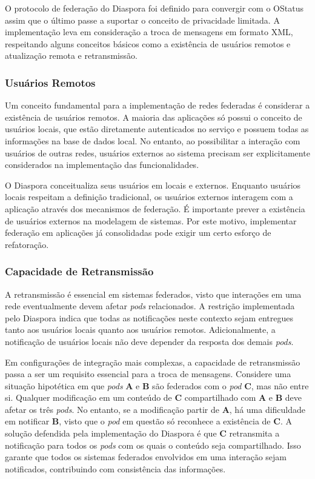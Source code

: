 O protocolo de federação do Diaspora foi definido para convergir com o OStatus assim
que o último passe a suportar o conceito de privacidade limitada. A implementação
leva em consideração a troca de mensagens em formato XML, respeitando alguns
conceitos básicos como a existência de usuários remotos e atualização remota e
retransmissão.

\subsubsection{Usuários Remotos}

Um conceito fundamental para a implementação de redes federadas é considerar a
existência de usuários remotos. A maioria das aplicações só possui o conceito de
usuários locais, que estão diretamente autenticados no serviço e possuem todas as
informações na base de dados local. No entanto, ao possibilitar a interação com
usuários de outras redes, usuários externos ao sistema precisam ser explicitamente
considerados na implementação das funcionalidades.

O Diaspora conceitualiza seus usuários em locais e externos. Enquanto usuários locais
respeitam a definição tradicional, os usuários externos interagem com a aplicação
através dos mecanismos de federação. É importante prever a existência de usuários
externos na modelagem de sistemas. Por este motivo, implementar federação em
aplicações já consolidadas pode exigir um certo esforço de refatoração. %

\subsubsection{Capacidade de Retransmissão}

A retransmissão é essencial em sistemas federados, visto que interações em uma rede
eventualmente devem afetar \textit{pods} relacionados. A restrição implementada pelo
Diaspora indica que todas as notificações neste contexto sejam entregues tanto aos
usuários locais quanto aos usuários remotos. Adicionalmente, a notificação de
usuários locais não deve depender da resposta dos demais \textit{pods}.

Em configurações de integração mais complexas, a capacidade de retransmissão passa a
ser um requisito essencial para a troca de mensagens. Considere uma situação
hipotética em que \textit{pods} \textbf{A} e \textbf{B} são federados com o
\textit{pod} \textbf{C}, mas não entre si. Qualquer modificação em um conteúdo de
\textbf{C} compartilhado com \textbf{A} e \textbf{B} deve afetar os três
\textit{pods}. No entanto, se a modificação partir de \textbf{A}, há uma dificuldade
em notificar \textbf{B}, visto que o \textit{pod} em questão só reconhece a
existência de \textbf{C}. A solução defendida pela implementação do Diaspora é que
\textbf{C} retransmita a notificação para todos os \textit{pods} com os quais o
conteúdo seja compartilhado. Isso garante que todos os sistemas federados envolvidos
em uma interação sejam notificados, contribuindo com consistência das informações.

